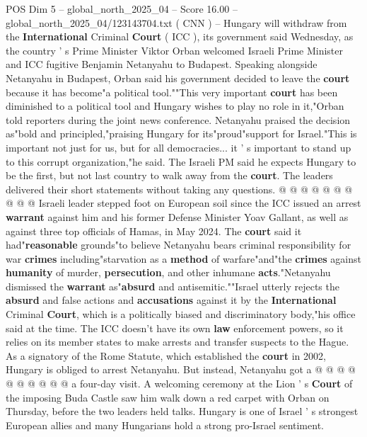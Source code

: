\begin{textsample}{POS Dim 5 – global\_north\_2025\_04 – Score 16.00 – global\_north\_2025\_04/123143704.txt}  \label{ex:f5_pos_093}
( CNN ) -- Hungary will withdraw from the \textbf{International} Criminal \textbf{Court} ( ICC ), its government said Wednesday, as the country ' s Prime Minister Viktor Orban welcomed Israeli Prime Minister and ICC fugitive Benjamin Netanyahu to Budapest.
Speaking alongside Netanyahu in Budapest, Orban said his government decided to leave the \textbf{court} because it has become"a political tool.""This very important \textbf{court} has been diminished to a political tool and Hungary wishes to play no role in it,"Orban told reporters during the joint news conference.
Netanyahu praised the decision as"bold and principled,"praising Hungary for its"proud"support for Israel."This is important not just for us, but for all democracies... it ' s important to stand up to this corrupt organization,"he said.
The Israeli PM said he expects Hungary to be the first, but not last country to walk away from the \textbf{court}.
The leaders delivered their short statements without taking any questions. @ @ @ @ @ @ @ @ @ @ Israeli leader stepped foot on European soil since the ICC issued an arrest \textbf{warrant} against him and his former Defense Minister Yoav Gallant, as well as against three top officials of Hamas, in May 2024.
The \textbf{court} said it had"\textbf{reasonable} grounds"to believe Netanyahu bears criminal responsibility for war \textbf{crimes} including"starvation as a \textbf{method} of warfare"and"the \textbf{crimes} against \textbf{humanity} of murder, \textbf{persecution}, and other inhumane \textbf{acts}."Netanyahu dismissed the \textbf{warrant} as"\textbf{absurd} and antisemitic.""Israel utterly rejects the \textbf{absurd} and false actions and \textbf{accusations} against it by the \textbf{International} Criminal \textbf{Court}, which is a politically biased and discriminatory body,"his office said at the time.
The ICC doesn't have its own \textbf{law} enforcement powers, so it relies on its member states to make arrests and transfer suspects to the Hague.
As a signatory of the Rome Statute, which established the \textbf{court} in 2002, Hungary is obliged to arrest Netanyahu.
But instead, Netanyahu got a @ @ @ @ @ @ @ @ @ @ a four-day visit.
A welcoming ceremony at the Lion ' s \textbf{Court} of the imposing Buda Castle saw him walk down a red carpet with Orban on Thursday, before the two leaders held talks.
Hungary is one of Israel ' s strongest European allies and many Hungarians hold a strong pro-Israel sentiment.

\end{textsample}

